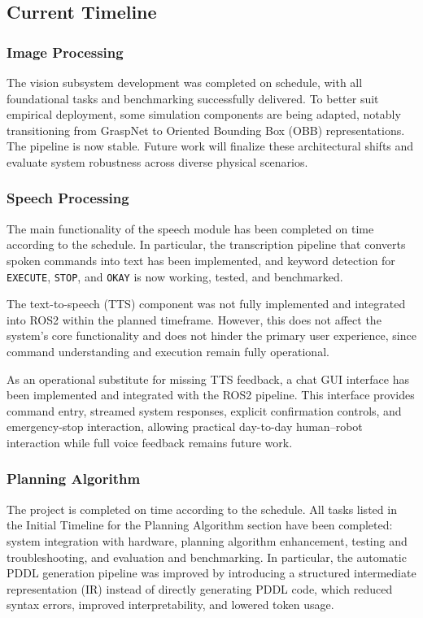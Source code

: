 \documentclass[12pt]{extarticle}
\begin{document}
\subsection{Current Timeline}

\subsubsection{Image Processing}
The vision subsystem development was completed on schedule, with all foundational tasks and benchmarking successfully delivered. To better suit empirical deployment, some simulation components are being adapted, notably transitioning from GraspNet to Oriented Bounding Box (OBB) representations. The pipeline is now stable. Future work will finalize these architectural shifts and evaluate system robustness across diverse physical scenarios.
\subsubsection{Speech Processing}
The main functionality of the speech module has been completed on time according to the schedule. In particular, the transcription pipeline that converts spoken commands into text has been implemented, and keyword detection for \texttt{EXECUTE}, \texttt{STOP}, and \texttt{OKAY} is now working, tested, and benchmarked.

The text-to-speech (TTS) component was not fully implemented and integrated into ROS2 within the planned timeframe. However, this does not affect the system's core functionality and does not hinder the primary user experience, since command understanding and execution remain fully operational.

As an operational substitute for missing TTS feedback, a chat GUI interface has been implemented and integrated with the ROS2 pipeline. This interface provides command entry, streamed system responses, explicit confirmation controls, and emergency-stop interaction, allowing practical day-to-day human--robot interaction while full voice feedback remains future work.

\subsubsection{Planning Algorithm}
The project is completed on time according to the schedule. All tasks listed in the Initial Timeline for the Planning Algorithm section have been completed: system integration with hardware, planning algorithm enhancement, testing and troubleshooting, and evaluation and benchmarking. In particular, the automatic PDDL generation pipeline was improved by introducing a structured intermediate representation (IR) instead of directly generating PDDL code, which reduced syntax errors, improved interpretability, and lowered token usage.
\end{document}
